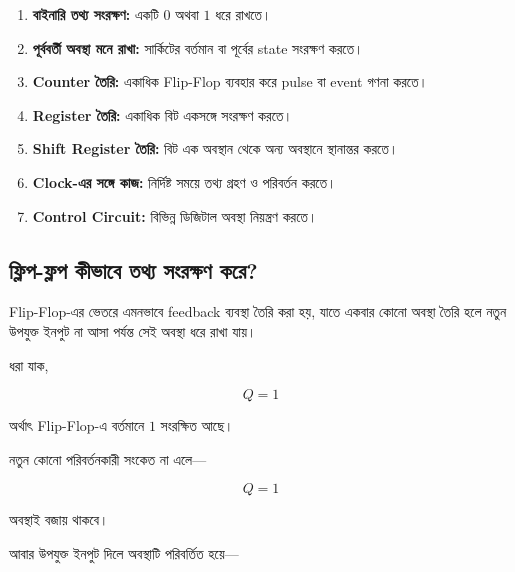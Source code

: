 \begin{enumerate}[leftmargin=*,itemsep=2pt]

    \item \textbf{বাইনারি তথ্য সংরক্ষণ:}
    একটি \(0\) অথবা \(1\) ধরে রাখতে।

    \item \textbf{পূর্ববর্তী অবস্থা মনে রাখা:}
    সার্কিটের বর্তমান বা পূর্বের \textenglish{state} সংরক্ষণ করতে।

    \item \textbf{\textenglish{Counter} তৈরি:}
    একাধিক \textenglish{Flip-Flop} ব্যবহার করে
    \textenglish{pulse} বা \textenglish{event} গণনা করতে।

    \item \textbf{\textenglish{Register} তৈরি:}
    একাধিক বিট একসঙ্গে সংরক্ষণ করতে।

    \item \textbf{\textenglish{Shift Register} তৈরি:}
    বিট এক অবস্থান থেকে অন্য অবস্থানে স্থানান্তর করতে।

    \item \textbf{\textenglish{Clock}-এর সঙ্গে কাজ:}
    নির্দিষ্ট সময়ে তথ্য গ্রহণ ও পরিবর্তন করতে।

    \item \textbf{\textenglish{Control Circuit}:}
    বিভিন্ন ডিজিটাল অবস্থা নিয়ন্ত্রণ করতে।

\end{enumerate}



\subsection{ফ্লিপ-ফ্লপ কীভাবে তথ্য সংরক্ষণ করে?}

\textenglish{Flip-Flop}-এর ভেতরে এমনভাবে
\textenglish{feedback} ব্যবস্থা তৈরি করা হয়, যাতে একবার কোনো অবস্থা
তৈরি হলে নতুন উপযুক্ত ইনপুট না আসা পর্যন্ত সেই অবস্থা ধরে রাখা যায়।

ধরা যাক,

\[
Q=1
\]

অর্থাৎ \textenglish{Flip-Flop}-এ বর্তমানে \(1\) সংরক্ষিত আছে।

নতুন কোনো পরিবর্তনকারী সংকেত না এলে—

\[
Q=1
\]

অবস্থাই বজায় থাকবে।

আবার উপযুক্ত ইনপুট দিলে অবস্থাটি পরিবর্তিত হয়ে—

